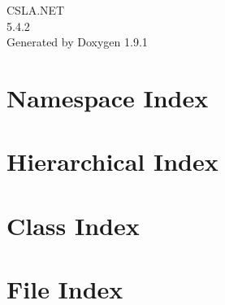 \let\mypdfximage\pdfximage\def\pdfximage{\immediate\mypdfximage}\documentclass[twoside]{book}
\newcommand{\+}{\discretionary{\mbox{\scriptsize$\hookleftarrow$}}{}{}}
\newcommand{\clearemptydoublepage}{%
  \newpage{\pagestyle{empty}\cleardoublepage}%
}
\begin{document}
\raggedbottom

\hypersetup{pageanchor=false,
             bookmarksnumbered=true,
             pdfencoding=unicode
            }
\begin{titlepage}
\vspace*{7cm}
\begin{center}%
{\Large CSLA.\+NET \\[1ex]\large 5.\+4.\+2 }\\
\vspace*{1cm}
{\large Generated by Doxygen 1.9.1}\\
\end{center}
\end{titlepage}
\clearemptydoublepage
{}
\tableofcontents
\clearemptydoublepage
{}
\hypersetup{pageanchor=true}

\chapter{Namespace Index}

\chapter{Hierarchical Index}

\chapter{Class Index}

\chapter{File Index}

\end{document}
